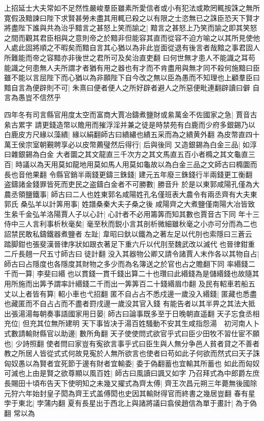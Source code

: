 上招延士大夫常如不足然性嚴峻羣臣雖素所愛信者或小有犯法或欺罔輒按誅之無所寛假汲黯諫曰陛下求賢甚勞未盡其用輒已殺之以有限之士恣無已之誅臣恐天下賢才將盡陛下誰與共為治乎黯言之甚怒上笑而諭之|{
	黯言之甚怒上乃笑而諭之即其笑怒之間而觀其君臣相與之意則帝之於黯非但能容其直而從容不迫方喻之以其所見使他人處此固將順之不暇矣而黯自言其心猶以為非此豈面從退有後言者哉黯之事君固人所難能而帝之容黯亦非後世之君所可及矣治直吏翻}
曰何世無才患人不能識之耳苟能識之何患無人夫所謂才者猶有用之器也有才而不肯盡用與無才同不殺何施黯曰臣雖不能以言屈陛下而心猶以為非願陛下自今改之無以臣為愚而不知理也上顧羣臣曰黯自言為便辟則不可|{
	朱熹曰便者便人之所好辟者避人之所惡便毗連翻辟讀曰僻}
自言為愚豈不信然乎

四年冬有司言縣官用度太空而富商大賈冶鑄煮鹽財或絫萬金不佐國家之急|{
	賈音古絫古累字}
請更錢造幣以贍用而摧浮淫并兼之徒是時禁苑有白鹿而少府多銀錫乃以白鹿皮方尺緣以藻繢|{
	緣以絹翻師古曰繢繡也繢五采而為之繢黄外翻}
為皮幣直四十萬王侯宗室朝覲聘享必以皮幣薦璧然后得行|{
	后與後同}
又造銀錫為白金三品|{
	如淳曰雜銀錫為白金}
大者圜之其文龍直三千次方之其文馬直五百小者橢之其文龜直三百|{
	時議以為天用莫如龍地用莫如馬人用莫如龜故以為白金三品之文師古曰橢圜而長也音他果翻}
令縣官銷半兩錢更鑄三銖錢|{
	建元五年廢三銖錢行半兩錢更工衡翻}
盗鑄諸金錢罪皆死而吏民之盗鑄白金者不可勝數|{
	勝音升}
於是以東郭咸陽孔僅為大農丞領鹽鐵事|{
	師古曰二人也姓東郭名咸陽姓孔名僅班表大農令有兩丞齊有大夫東郭氏}
桑弘羊以計筭用事|{
	姓譜桑秦大夫子桑之後}
咸陽齊之大煮鹽僅南陽大冶皆致生絫千金弘羊洛陽賈人子以心計|{
	心計者不必用籌筭而知其數也賈音古下同}
年十三侍中三人言利事析秋毫矣|{
	毫至秋而鋭小言其剖析微細雖秋毫之小亦可分而為二也}
詔禁民敢私鑄鐵器煮鹽者左趾|{
	韋昭曰釱以鐵為之著左足以代刖也索隱曰三蒼云踏脚鉗也張斐漢晉律序狀如跟衣著足下重六斤以代刖至魏武改以滅代也晉律鉗重二斤長翹一尺五寸師古曰徒計翻}
没入其器物公卿又請令諸賈人末作各以其物自占|{
	師古曰占隱度也各隱度其財物之多少而為名簿送之於官也占之贍翻下同}
率緡錢二千而一算|{
	李斐曰緡也以貫錢一貫千錢出算二十也瓚曰此緡錢為是儲緡錢也故隨其用所施而出筭予謂率計緡錢二千而出一筭筭百二十錢緡眉巾翻}
及民有軺車若船五丈以上者皆有算|{
	軺小車也弋招翻}
匿不自占占不悉戍邊一歲没入緡錢|{
	匿藏也悉盡也藏匿而不自占占而不盡者罸戌邊一歲没其官入錢}
有能告者以其半畀之其法大抵出張湯湯每朝奏事語國家用日晏|{
	師古曰論事既多至于日晚朝直遥翻}
天子忘食丞相充位|{
	但充其位無所建明}
天下事皆决于湯百姓騷動不安其生咸指怨湯　初河南人卜式數請輸財縣官以助邊|{
	數所角翻}
天子使使問式欲官乎式曰臣少田牧不習仕宦不願也|{
	少詩照翻}
使者問曰家豈有寃欲言事乎式曰臣生與人無分争邑人貧者貸之不善者教之所居人皆從式式何故見寃於人無所欲言也使者曰苟如此子何欲而然式曰天子誅匈奴愚以為賢者宜死節于邊有財者宜輸委|{
	委于偽翻蓄也宜輸其所蓄也}
如此而匈奴可滅也上由是賢之欲尊顯以風百姓|{
	師古曰風讀曰諷又如字}
乃召拜式為中郎爵左庶長賜田十頃布告天下使明知之未幾又擢式為齊太傅|{
	齊王次昌元朔三年薨無後國除元狩六年始封皇子閎為齊王式盖傅閎也史因其輸財得官而終書之幾居豈翻}
春有星孛于東北|{
	孛蒲内翻}
夏有長星出于西北上與諸將議曰翕侯趙信為單于畫計|{
	為于偽翻}
常以為

